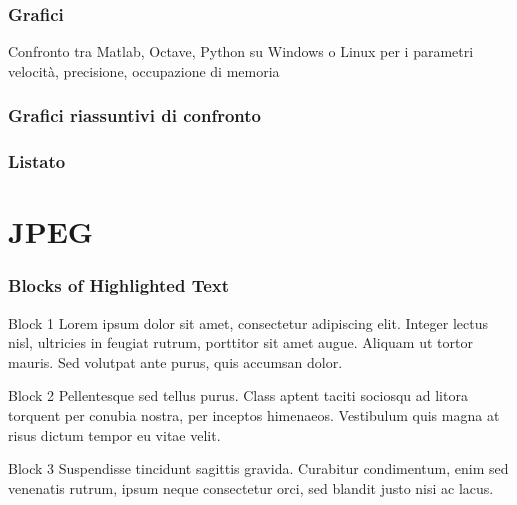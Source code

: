 \documentclass{beamer}
\begin{document}
\frametitle{Grafici}
\begin{frame}
Confronto tra Matlab,  Octave, Python su Windows o Linux per i parametri velocità, precisione, occupazione di memoria
\end{frame}

\frametitle{Grafici riassuntivi di confronto}
\begin{frame}

\end{frame}

\frametitle{Listato}
\begin{frame}

\end{frame}

\section{JPEG}



\begin{frame}
\frametitle{Blocks of Highlighted Text}
\begin{block}{Block 1}
Lorem ipsum dolor sit amet, consectetur adipiscing elit. Integer lectus nisl, ultricies in feugiat rutrum, porttitor sit amet augue. Aliquam ut tortor mauris. Sed volutpat ante purus, quis accumsan dolor.
\end{block}

\begin{block}{Block 2}
Pellentesque sed tellus purus. Class aptent taciti sociosqu ad litora torquent per conubia nostra, per inceptos himenaeos. Vestibulum quis magna at risus dictum tempor eu vitae velit.
\end{block}

\begin{block}{Block 3}
Suspendisse tincidunt sagittis gravida. Curabitur condimentum, enim sed venenatis rutrum, ipsum neque consectetur orci, sed blandit justo nisi ac lacus.
\end{block}
\end{frame}

\end{document}
